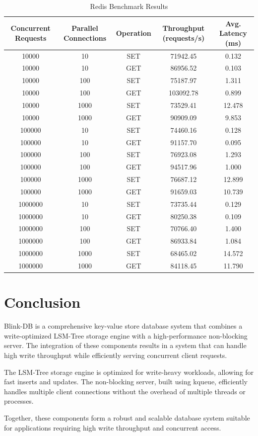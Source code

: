 \documentclass{article}
\begin{document}
\begin{table}[htbp]
    \centering
    \caption{Redis Benchmark Results}
    \begin{tabular}{ccccc}
    \toprule
    Concurrent Requests & Parallel Connections & Operation & Throughput (requests/s) & Avg. Latency (ms) \\
    \midrule
    10000 & 10 & SET & 71942.45 & 0.132 \\
    10000 & 10 & GET & 86956.52 & 0.103 \\
    \midrule
    10000 & 100 & SET & 75187.97 & 1.311 \\
    10000 & 100 & GET & 103092.78 & 0.899 \\
    \midrule
    10000 & 1000 & SET & 73529.41 & 12.478 \\
    10000 & 1000 & GET & 90909.09 & 9.853 \\
    \midrule
    100000 & 10 & SET & 74460.16 & 0.128 \\
    100000 & 10 & GET & 91157.70 & 0.095 \\
    \midrule
    100000 & 100 & SET & 76923.08 & 1.293 \\
    100000 & 100 & GET & 94517.96 & 1.000 \\
    \midrule
    100000 & 1000 & SET & 76687.12 & 12.899 \\
    100000 & 1000 & GET & 91659.03 & 10.739 \\
    \midrule
    1000000 & 10 & SET & 73735.44 & 0.129 \\
    1000000 & 10 & GET & 80250.38 & 0.109 \\
    \midrule
    1000000 & 100 & SET & 70766.40 & 1.400 \\
    1000000 & 100 & GET & 86933.84 & 1.084 \\
    \midrule
    1000000 & 1000 & SET & 68465.02 & 14.572 \\
    1000000 & 1000 & GET & 84118.45 & 11.790 \\
    \bottomrule
    \end{tabular}
    \label{tab:redis_benchmark}
\end{table}

\section{Conclusion}

Blink-DB is a comprehensive key-value store database system that combines a write-optimized LSM-Tree storage engine with a high-performance non-blocking server. The integration of these components results in a system that can handle high write throughput while efficiently serving concurrent client requests.

The LSM-Tree storage engine is optimized for write-heavy workloads, allowing for fast inserts and updates. The non-blocking server, built using kqueue, efficiently handles multiple client connections without the overhead of multiple threads or processes.

Together, these components form a robust and scalable database system suitable for applications requiring high write throughput and concurrent access.
\end{document}
